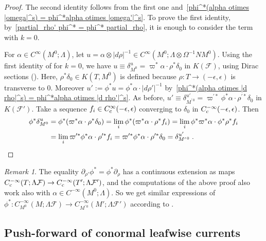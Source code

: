 \documentclass{memo-l}
\theoremstyle{plain}
\theoremstyle{definition}
\theoremstyle{remark}
\newtheorem{rem}[thm]{Remark}
\newcommand{\FF}{\mathcal{F}}
\newcommand{\co}{{\text{\rm c}}}
\newcommand{\Cinftyc}{C^\infty_{\text{\rm c}}}
\numberwithin{section}{chapter}
\numberwithin{equation}{section}%
\begin{document}
\begin{proof}
The second identity follows from the first one and~\eqref{phi^*(alpha otimes |omega|^s) = phi^*alpha otimes |omega'|^s}. To prove the first identity, by~\eqref{partial_rho' phi^* = phi^* partial_rho}, it is enough to consider the term with $k=0$. 

For $\alpha\in C^\infty(M^0;\Lambda)$, let $u=\alpha\otimes|d\rho|^{-1}\in C^\infty(M^0;\Lambda\otimes\Omega^{-1}NM^0)$. Using the first identity of  for $k=0$, we have $u\equiv\delta_{M^0}^u=\varpi^*\alpha\cdot\rho^*\delta_0$ in $K(\FF)$, using Dirac sections (). Here, $\rho^*\delta_0\in K(T,M^0)$ is defined because $\rho:T\to(-\epsilon,\epsilon)$ is transverse to $0$. Moreover $u':=\phi^*u=\phi^*\alpha\cdot|d\rho'|^{-1}$ by~\eqref{phi^*(alpha otimes |d rho|^s) = phi^*alpha otimes |d rho'|^s}. As before, $u'\equiv\delta_{M^{\prime\,0}}^{u'}=\varpi^{\prime*}\phi^*\alpha\cdot\rho^{\prime*}\delta_0$ in $K(\FF')$. Take a sequence $f_i\in\Cinftyc(-\epsilon,\epsilon)$ converging to $\delta_0$ in $C^{-\infty}_\co(-\epsilon,\epsilon)$. Then
\begin{align*}
\phi^*\delta_{M^0}^u&=\phi^*(\varpi^*\alpha\cdot\rho^*\delta_0)
=\lim_i\phi^*(\varpi^*\alpha\cdot\rho^*f_i)
=\lim_i\phi^*\varpi^*\alpha\cdot\phi^*\rho^*f_i\\
&=\lim_i\varpi^{\prime*}\phi^*\alpha\cdot\rho^{\prime*}f_i
=\varpi^{\prime*}\phi^*\alpha\cdot\rho^{\prime*}\delta_0
=\delta_{M^{\prime\,0}}^{u'}\;.\qedhere
\end{align*}
\end{proof}

\begin{rem}\label{r: phi^* equiv prod_k phi^*}
The equality $\partial_{\rho'}\phi^*=\phi^*\partial_\rho$ has a continuous extension as maps $C^{-\infty}_\co(T;\Lambda\FF)\to C^{-\infty}_\co(T';\Lambda\FF')$, and the computations of the above proof also work also with $\alpha\in C^{-\infty}(M^0;\Lambda)$. So we get similar expressions of $\phi^*:C^{-\infty}_{M^0}(M;\Lambda\FF)\to C^{-\infty}_{M^{\prime\,0}}(M';\Lambda\FF')$ according to .
\end{rem}


\subsection{Push-forward of conormal leafwise currents}\label{ss: push-forward of conormal leafwise currents}
\end{document}
